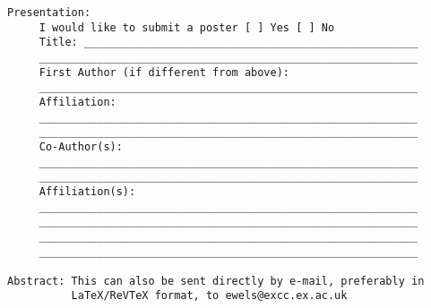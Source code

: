 {\begin{verbatim}
Presentation:
     I would like to submit a poster [ ] Yes [ ] No
     Title: ____________________________________________________
     ___________________________________________________________
     First Author (if different from above):
     ___________________________________________________________
     Affiliation:
     ___________________________________________________________
     ___________________________________________________________
     Co-Author(s):
     ___________________________________________________________
     ___________________________________________________________
     Affiliation(s):
     ___________________________________________________________
     ___________________________________________________________
     ___________________________________________________________
     ___________________________________________________________

Abstract: This can also be sent directly by e-mail, preferably in
          LaTeX/ReVTeX format, to ewels@excc.ex.ac.uk
\end{verbatim}

\newpage
\null

}
